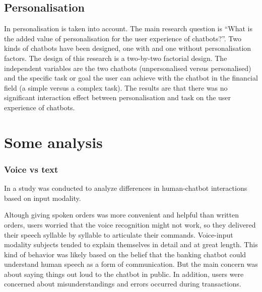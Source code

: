 \subsection{Personalisation} 
In \cite{duijst2017} personalisation is taken into account. The main research question is “What is the added value of personalisation for the user experience of chatbots?”. Two kinds of chatbots have been designed, one with and one without personalisation factors. The design of this research is a two-by-two factorial design. The independent variables are the two chatbots (unpersonalised versus personalised) and the specific task or goal the user can achieve with the chatbot in the financial field (a simple versus a complex task). The results are that there was no significant interaction effect between personalisation and task on the user experience of chatbots. 

\section{Some analysis}

\subsubsection{Voice vs text}
In \cite{kim2018} a study was conducted to analyze differences in human-chatbot interactions based on input modality.

Altough giving spoken orders was more convenient and helpful than written orders, users worried that the voice recognition might not work, so they delivered their speech syllable by syllable to articulate their commands. Voice-input modality subjects tended to explain themselves in detail and at great length. This kind of behavior was likely based on the belief that the banking chatbot could understand human speech as a form of communication. But the main concern was about saying things out loud to the chatbot in public. In addition, users were concerned about misunderstandings and errors occurred during transactions.



